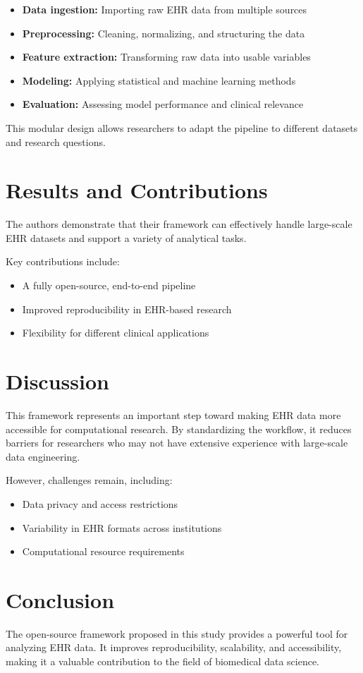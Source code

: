 \documentclass[12pt]{article}
\begin{document}
\begin{itemize}
    \item \textbf{Data ingestion:} Importing raw EHR data from multiple sources
    \item \textbf{Preprocessing:} Cleaning, normalizing, and structuring the data
    \item \textbf{Feature extraction:} Transforming raw data into usable variables
    \item \textbf{Modeling:} Applying statistical and machine learning methods
    \item \textbf{Evaluation:} Assessing model performance and clinical relevance
\end{itemize}

This modular design allows researchers to adapt the pipeline to different datasets and research questions.

\section{Results and Contributions}

The authors demonstrate that their framework can effectively handle large-scale EHR datasets 
and support a variety of analytical tasks.

Key contributions include:
\begin{itemize}
    \item A fully open-source, end-to-end pipeline
    \item Improved reproducibility in EHR-based research
    \item Flexibility for different clinical applications
\end{itemize}

\section{Discussion}

This framework represents an important step toward making EHR data more accessible for computational research. 
By standardizing the workflow, it reduces barriers for researchers who may not have extensive experience 
with large-scale data engineering.

However, challenges remain, including:
\begin{itemize}
    \item Data privacy and access restrictions
    \item Variability in EHR formats across institutions
    \item Computational resource requirements
\end{itemize}

\section{Conclusion}

The open-source framework proposed in this study provides a powerful tool for analyzing EHR data. 
It improves reproducibility, scalability, and accessibility, making it a valuable contribution 
to the field of biomedical data science.



\end{document}
